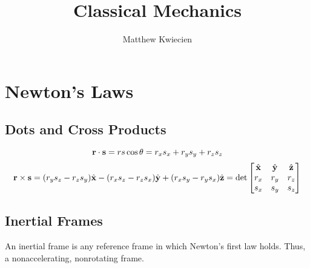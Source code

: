 \documentclass{article}
\title{Classical Mechanics}
\author{Matthew Kwiecien}
\newcommand{\vh}[1]{\hat{\vb{#1}}}
\begin{document}
\maketitle

\section{Newton's Laws}
\subsection*{Dots and Cross Products}
\begin{equation*}
   \vb{r} \cdot \vb{s} = rs\cos\theta = r_{x}s_{x}+r_{y}s_{y}+r_{z}s_{z}
\end{equation*}
\begin{equation*}
   \vb{r} \times \vb{s} =  (r_{y}s_{z}-r_{z}s_{y})\vh{x} - (r_{x}s_{z}-r_{z}s_{x})\vh{y} + 
   (r_{x}s_{y}-r_{y}s_{x})\vh{z} = 
   \det 
\begin{bmatrix}
    \vh{x} & \vh{y} & \vh{z} \\
    r_{x} & r_{y} & r_{z} \\
    s_{x} & s_{y} & s_{z} \\
\end{bmatrix}
\end{equation*}

\subsection*{Inertial Frames}
An inertial frame is any reference frame in which Newton's first law holds.  Thus, a nonaccelerating, nonrotating frame.
\end{document}
